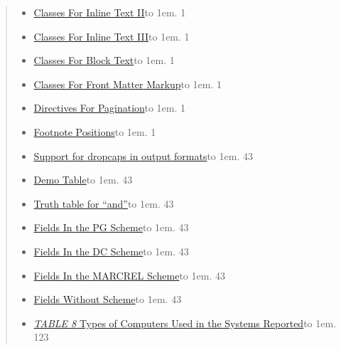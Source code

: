 \documentclass[a5paper]{book}
\begin{document}
\begin{german}
\begin{quotation}
\begin{container}
\begin{itemize}
\item[] \hyperlink{table-47}{Classes For Inline Text II}\leaders\hbox to 1em{\hss.\hss}\hfill{} 1

\item[] \hyperlink{table-48}{Classes For Inline Text III}\leaders\hbox to 1em{\hss.\hss}\hfill{} 1

\item[] \hyperlink{table-49}{Classes For Block Text}\leaders\hbox to 1em{\hss.\hss}\hfill{} 1

\item[] \hyperlink{table-50}{Classes For Front Matter Markup}\leaders\hbox to 1em{\hss.\hss}\hfill{} 1

\item[] \hyperlink{table-51}{Directives For Pagination}\leaders\hbox to 1em{\hss.\hss}\hfill{} 1

\item[] \hyperlink{table-52}{Footnote Positions}\leaders\hbox to 1em{\hss.\hss}\hfill{} 1

\item[] \hyperlink{table-53}{Support for dropcaps in output formats}\leaders\hbox to 1em{\hss.\hss}\hfill{} 43

\item[] \hyperlink{table-54}{Demo Table}\leaders\hbox to 1em{\hss.\hss}\hfill{} 43

\item[] \hyperlink{table-55}{Truth table for “and”}\leaders\hbox to 1em{\hss.\hss}\hfill{} 43

\item[] \hyperlink{table-56}{Fields In the PG Scheme}\leaders\hbox to 1em{\hss.\hss}\hfill{} 43

\item[] \hyperlink{table-57}{Fields In the DC Scheme}\leaders\hbox to 1em{\hss.\hss}\hfill{} 43

\item[] \hyperlink{table-58}{Fields In the MARCREL Scheme}\leaders\hbox to 1em{\hss.\hss}\hfill{} 43

\item[] \hyperlink{table-59}{Fields Without Scheme}\leaders\hbox to 1em{\hss.\hss}\hfill{} 43

\item[] \hyperlink{table-60}{{\itshape{TABLE 8}} Types of Computers Used in the Systems Reported}\leaders\hbox to 1em{\hss.\hss}\hfill{} 123
\end{itemize}
\end{container}
\end{quotation}


\end{german}
\end{document}
